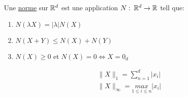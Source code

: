 \begin{definition}
    Une \underline{norme} sur $\mathbb{R}^d$ est une application  $N: \: \mathbb{R}^d \to \mathbb{R}$ tell que:
    \begin{enumerate}
        \item $N(\lambda X) = |\lambda|N(X)$
        \item  $N(X + Y) \le N(X) + N(Y)$
        \item $N(X) \ge 0$ et $N(X) = 0 \iff X = 0_d$
    \end{enumerate}
\end{definition}
\begin{eg}
   \begin{align*}
       &\|X\|_1 = \sum_{n=1}^{d} |x_i|\\
       &\|X\|_{\infty} = \underset{1\le i \le n}{max} |x_i|
   \end{align*} 
\end{eg}
